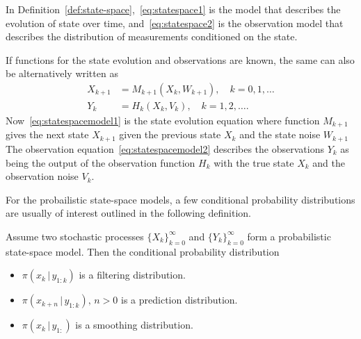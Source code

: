 In Definition~\ref{def:state-space},~\eqref{eq:statespace1} is the model that describes the evolution of state over time, and~\eqref{eq:statespace2} is the observation model that describes the distribution of measurements conditioned on the state.

If functions for the state evolution and observations are known, the same can also be alternatively written as 
\begin{subequations}\label{eq:statespacemodel}
    \begin{align}
        X_{k+1} &= M_{k+1}(X_{k}, W_{k+1}), \quad k = 0,1,\dots \label{eq:statespacemodel1}\\
        Y_{k} &= H_{k}(X_{k}, V_{k}), \quad k = 1,2,\dots. \label{eq:statespacemodel2}
    \end{align}
\end{subequations}
Now~\eqref{eq:statespacemodel1} is the state evolution equation where function $M_{k+1}$ gives the next state $X_{k+1}$ given the previous state $X_{k}$ and the state noise $W_{k+1}$
The observation equation~\eqref{eq:statespacemodel2} describes the observations $Y_{k}$ as being the output of the observation function $H_{k}$ with the true state $X_{k}$ and the observation noise $V_{k}$.

For the probailistic state-space models, a few conditional probability distributions are usually of interest outlined in the following definition.
\begin{definition}
    Assume two stochastic processes $\{X_k\}_{k=0}^{\infty}$ and $\{Y_k\}_{k=0}^{\infty}$ form a probabilistic state-space model.
    Then the conditional probability distribution
    \begin{itemize}
        \item
            $\pi(x_k \, \vert \, y_{1:k})$ is a filtering distribution.
        \item
            $\pi(x_{k+n}\, \vert \, y_{1:k}), \, n > 0$ is a prediction distribution.
        \item
            $\pi(x_k \, \vert \, y_{1:})$ is a smoothing distribution.
    \end{itemize}
\end{definition}

